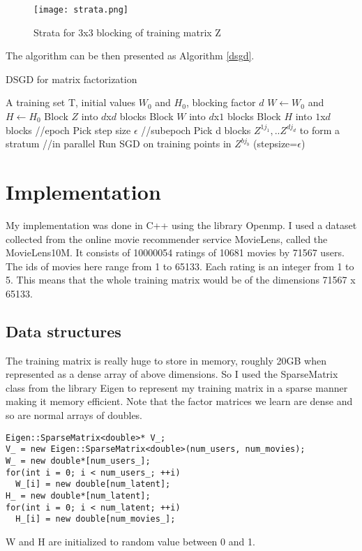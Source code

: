 \documentclass[a4paper,11pt]{article}
\begin{document}
\begin{figure}[h]
   \centering
    \texttt{[image: strata.png]}
    \caption{Strata for 3x3 blocking of training matrix Z }
   \label{fig:strata}
\end{figure}
The algorithm can be then presented as Algorithm \ref{dsgd}.
\begin{algorithm}
\caption{DSGD for matrix factorization}
\label{dsgd}
\begin{algorithmic}[1]
\Require A training set T, initial values $W_0$ and $H_0$, blocking factor $d$
\State $W \leftarrow W_0 $ and $H \leftarrow H_0$
\State Block $Z$ into $d$x$d$ blocks
\State Block $W$ into $d$x$1$ blocks
\State Block $H$ into $1$x$d$ blocks
 \hspace{1in}//epoch
\State Pick step size $\epsilon$
 \hspace{1in}//subepoch
\State Pick d blocks $Z^{1j_1},..Z^{dj_d}$ to form a stratum
 \hspace{1in} //in parallel
\State Run SGD on training points in $Z^{bj_b}$ (stepsize=$\epsilon$)
\EndFor
\EndFor
\EndWhile
\end{algorithmic}
\end{algorithm}
\section{Implementation}
My implementation was done in C++ using the library Openmp. I used a dataset collected from the online movie recommender service MovieLens, called the MovieLens10M. It consists of 10000054 ratings of 10681 movies by 71567 users.  The ids of movies here range from 1 to 65133. Each rating is an integer from 1 to 5. This means that the whole training matrix would be of the dimensions 71567 x 65133. 
\subsection{Data structures}
The training matrix is really huge to store in memory, roughly 20GB when represented as a dense array of above dimensions. So I used the SparseMatrix class from the library Eigen to represent my training matrix in a sparse manner making it memory efficient. Note that the factor matrices we learn are dense and so are normal arrays of doubles.
\begin{lstlisting}
Eigen::SparseMatrix<double>* V_;
V_ = new Eigen::SparseMatrix<double>(num_users, num_movies);
W_ = new double*[num_users_];
for(int i = 0; i < num_users_; ++i)
  W_[i] = new double[num_latent];
H_ = new double*[num_latent];
for(int i = 0; i < num_latent; ++i)
  H_[i] = new double[num_movies_];
\end{lstlisting}
W and H are initialized to random value between 0 and 1. 
\end{document}
